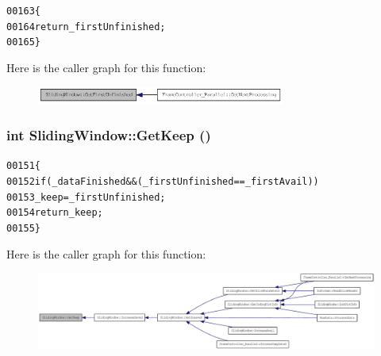 \begin{footnotesize}\begin{alltt}
00163         \{
00164                 \textcolor{keywordflow}{return} \_firstUnfinished;
00165         \}
\end{alltt}\end{footnotesize}




Here is the caller graph for this function:\nopagebreak
\begin{figure}[H]
\begin{center}
\leavevmode
\includegraphics[width=231pt]{class_sliding_window_a3be69abc76bff5b71ab96dadcced9f65_icgraph}
\end{center}
\end{figure}


\hypertarget{class_sliding_window_a0aafbf41ff2b7bb6c32fb60075bfeb22}{
\subsubsection[{GetKeep}]{\setlength{\rightskip}{0pt plus 5cm}int SlidingWindow::GetKeep ()}}
\label{class_sliding_window_a0aafbf41ff2b7bb6c32fb60075bfeb22}




\begin{footnotesize}\begin{alltt}
00151         \{
00152                 \textcolor{keywordflow}{if} (\_dataFinished && (\_firstUnfinished == \_firstAvail))
00153                         \_keep = \_firstUnfinished;
00154                 \textcolor{keywordflow}{return} \_keep;
00155         \}
\end{alltt}\end{footnotesize}




Here is the caller graph for this function:\nopagebreak
\begin{figure}[H]
\begin{center}
\leavevmode
\includegraphics[width=420pt]{class_sliding_window_a0aafbf41ff2b7bb6c32fb60075bfeb22_icgraph}
\end{center}
\end{figure}


